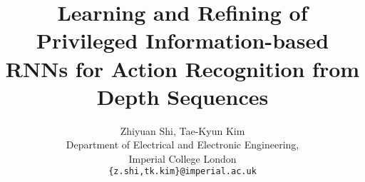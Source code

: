 \documentclass[10pt,twocolumn,letterpaper]{article}
\begin{document}
\title{Learning and Refining of Privileged Information-based RNNs for Action Recognition from Depth Sequences}

\author{Zhiyuan Shi, Tae-Kyun Kim\\
Department of Electrical and Electronic Engineering,\\
Imperial College London\\
{\tt\small \{z.shi,tk.kim\}@imperial.ac.uk}
}

\maketitle
\end{document}
